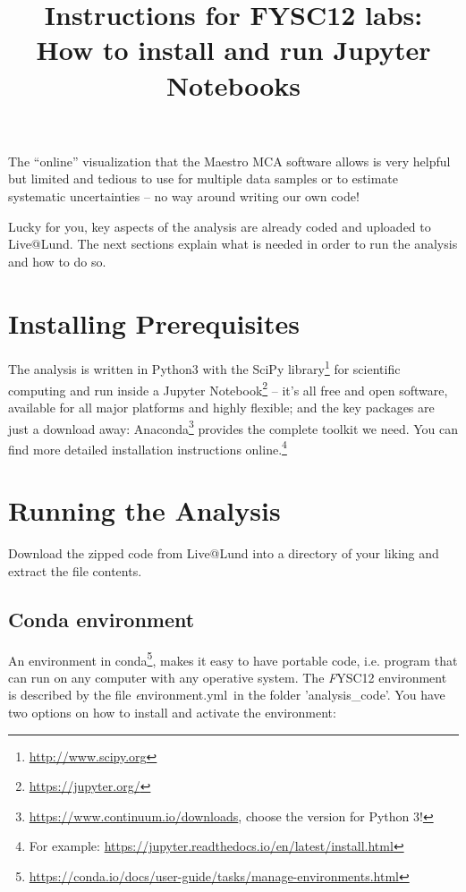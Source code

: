 \documentclass[a4,11pt, notitlepage]{article}
\begin{document}
\title{Instructions for FYSC12 labs:\\ How to install and run Jupyter Notebooks}
\date{}
\maketitle

\vspace{-1cm}

The ``online'' visualization that the Maestro MCA software allows is
very helpful but limited and tedious to use for multiple data samples
or to estimate systematic uncertainties
-- no way around writing our own code!

Lucky for you, key aspects of the analysis are already coded and
uploaded to Live@Lund. The next
sections explain what is needed in order to run the analysis and how
to do so.

\section{Installing Prerequisites}
\label{sec:prerequisites}

The analysis is written in Python3 with the SciPy
library\footnote{\url{http://www.scipy.org}} for scientific computing and run
inside a Jupyter Notebook\footnote{\url{https://jupyter.org/}} -- it's all
  free and open software, available for all major platforms and
  highly flexible; and the key packages are just a download away:
  Anaconda\footnote{\url{https://www.continuum.io/downloads}, choose the version
    for Python 3!} provides the complete toolkit we need.
  You can find more detailed installation instructions online.\footnote{For
  example: \url{https://jupyter.readthedocs.io/en/latest/install.html}}


\section{Running the Analysis}
\label{sec:running-analysis}
Download the zipped code from Live@Lund into a directory
of your liking and extract the file contents.

\subsection*{Conda environment}
An environment in conda\footnote{\url{https://conda.io/docs/user-guide/tasks/manage-environments.html}}, makes it easy to have portable code, i.e. program that can run on any computer with any operative system.
The {\emph FYSC12} environment is described by the file {\emph environment.yml} in the folder 'analysis\_code'.
You have two options on how to install and activate the environment:
\end{document}
